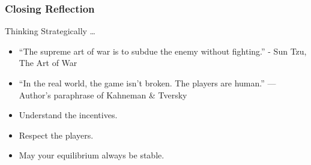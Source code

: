 \begin{frame}[fragile]\frametitle{Closing Reflection}

\begin{block}{Thinking Strategically \ldots}
  \begin{itemize}
    \item ``The supreme art of war is to subdue the enemy 
      without fighting.'' - Sun Tzu, The Art of War
    \item ``In the real world, the game isn't broken. The players are human.'' --- Author's paraphrase of Kahneman \& Tversky
    \item Understand the incentives.
    \item Respect the players.
    \item May your equilibrium always be stable.
  \end{itemize}
\end{block}  
\end{frame}